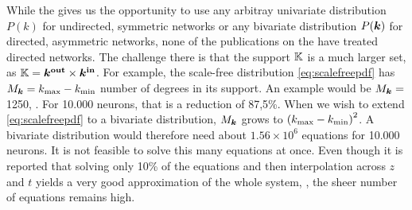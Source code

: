 While the \MFR gives us the opportunity to use any arbitray univariate distribution $P(k)$ for undirected, symmetric networks or any bivariate distribution $P({\boldsymbol{k}})$ for directed, asymmetric networks, none of the publications on the \MFR have treated directed networks. The challenge there is that the support ${\mathbb{K}}$ is a much larger set, as ${\mathbb{K}} = \boldsymbol{{k^{\rm out}}} \times {\boldsymbol{k^{\rm in}}}$. For example, the scale-free distribution \eqref{eq:scalefreepdf} has $M_{{\boldsymbol{k}}} = k_{\text{max}} - k_{\text{min}}$ number of degrees in its support. An example would be $M_{{\boldsymbol{k}}} = $ 1250, \cite{OttAntonsen2017}. For 10.000 neurons, that is a reduction of 87,5\%. When we wish to extend \eqref{eq:scalefreepdf} to a bivariate distribution, $M_{{\boldsymbol{k}}}$ grows to $\left( \kmax - \kmin \right)^2$. A bivariate distribution would therefore need about $1.56 \times 10^6$ equations for 10.000 neurons. It is not feasible to solve this many equations at once. Even though it is reported that solving only 10\% of the equations and then interpolation across $z$ and $t$ yields a very good approximation of the whole system, \cite{OttAntonsen2017}, the sheer number of equations remains high.

